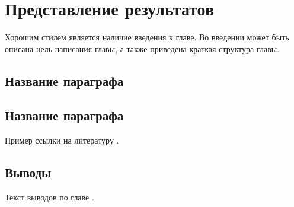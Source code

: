 \chapter{Представление результатов} \label{ch4}


Хорошим стилем является наличие введения к главе. Во введении может быть описана цель написания главы, а также приведена краткая структура главы. 
	
\section{Название параграфа} \label{ch4:sec1}

\section{Название параграфа} \label{ch4:sec2}

Пример ссылки на литературу \cite{avtonomova:fya,Peskov2004-ru,Kotelnikov2004-ru,Kotelnikov2004}.


\section{Выводы} \label{ch4:conclusion}

Текст выводов по главе \thechapter.

%
